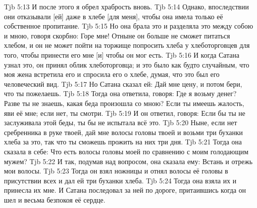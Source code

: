 \vs Tjb 5:13
И после этого я обрел храбрость вновь.
\vs Tjb 5:14
Однако, впоследствии они отказывали [ей] даже в хлебе [для меня], чтобы она имела только её собственное пропитание.
\vs Tjb 5:15
Но она брала это и разделяла это между собою и мною, говоря скорбно: Горе мне! Отныне он больше не сможет питаться хлебом, и он не может пойти на торжище попросить хлеба у хлеботорговцев для того, чтобы принести его мне [и] чтобы он мог есть.
\vs Tjb 5:16
И когда Сатана узнал это, он принял облик хлеботорговца; и это было как будто случайным, что моя жена встретила его и спросила его о хлебе, думая, что это был его человеческий вид.
\vs Tjb 5:17
Но Сатана сказал ей: Дай мне цену, и потом бери, что ты пожелаешь.
\vs Tjb 5:18
Тогда она ответила, говоря: Где я возьму денег? Разве ты не знаешь, какая беда произошла со мною? Если ты имеешь жалость, яви её мне; если нет, ты смотри.
\vs Tjb 5:19
И он ответил, говоря: Если бы ты не заслуживала этой беды, ты бы не испытала всё это.
\vs Tjb 5:20
Ныне, если нет сребренника в руке твоей, дай мне волосы головы твоей и возьми три буханки хлеба за это, так что ты сможешь прожить на них три дня.
\vs Tjb 5:21
Тогда она сказала в себе: Что есть волосы головы моей по сравнению с моим голодающим мужем?
\vs Tjb 5:22
И так, подумав над вопросом, она сказала ему: Встань и отрежь мои волосы.
\vs Tjb 5:23
Тогда он взял ножницы и отнял волосы её головы в присутствии всех и дал ей три буханки хлеба.
\vs Tjb 5:24
Тогда она взяла их и принесла их мне. И Сатана последовал за ней по дороге, притаившись когда он шел и весьма безпокоя её сердце.

